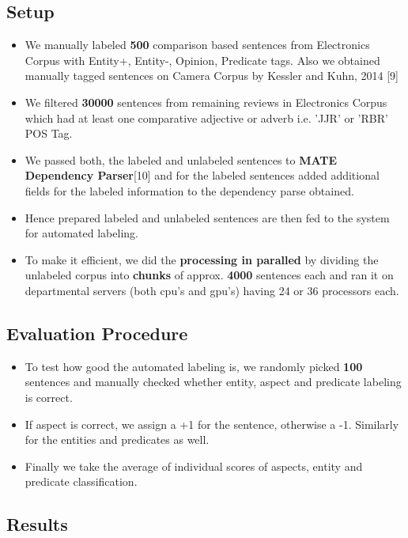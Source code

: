 \documentclass[12pt]{article}
\begin{document}
\subsection{Setup}
\begin{itemize}
\item We manually labeled \textbf{500} comparison based sentences from Electronics Corpus with Entity+, Entity-, Opinion, Predicate tags. Also we obtained manually tagged sentences on Camera Corpus by Kessler and Kuhn, 2014 [9]
\item We filtered \textbf{30000} sentences from remaining reviews in Electronics Corpus which had at least one comparative adjective or adverb i.e. 'JJR' or 'RBR' POS Tag.
\item We passed both, the labeled and unlabeled sentences to \textbf{MATE Dependency Parser}[10] and for the labeled sentences added additional fields for the labeled information to the dependency parse obtained.
\item Hence prepared labeled and unlabeled sentences are then fed to the system for automated labeling.
\item To make it efficient, we did the \textbf{processing in paralled} by dividing the unlabeled corpus into \textbf{chunks} of approx. \textbf{4000} sentences each and ran it on departmental servers (both cpu's and gpu's) having 24 or 36 processors each.
\end{itemize}

\subsection{Evaluation Procedure}
\begin{itemize}
\item To test how good the automated labeling is, we randomly picked \textbf{100} sentences and manually checked whether entity, aspect and predicate labeling is correct. \item If aspect is correct, we assign a +1 for the sentence, otherwise a -1. Similarly for the entities and predicates as well. 
\item Finally we take the average of individual scores of aspects, entity and predicate classification.
\end{itemize}

\subsection{Results}
\end{document}
